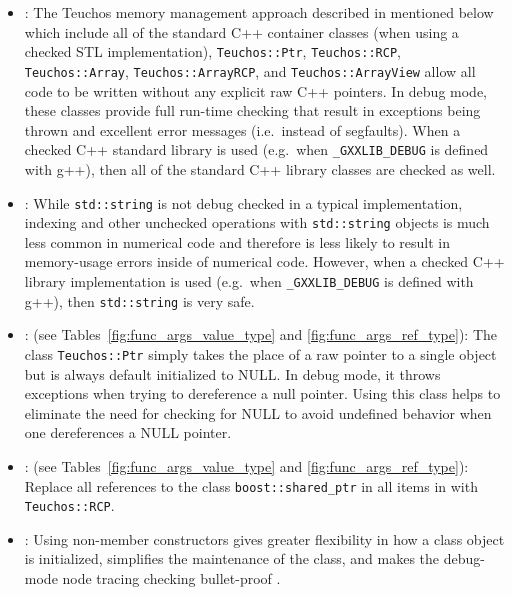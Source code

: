 \begin{itemize}


{}\item\GCGAvoidRawPointers: The Teuchos memory management approach
described in {}\cite{TeuchosMemoryManagementGuide} mentioned below
which include all of the standard C++ container classes (when using a
checked STL implementation), {}\texttt{Teuchos::\-Ptr},
{}\texttt{Teuchos::\-RCP}, {}\texttt{Teuchos::\-Array},
{}\texttt{Teuchos::\-Array\-RCP}, and
{}\texttt{Teuchos::\-Array\-View} allow all code to be written without
any explicit raw C++ pointers.  In debug mode, these classes provide
full run-time checking that result in exceptions being thrown and
excellent error messages (i.e.\ instead of segfaults).  When a checked
C++ standard library is used (e.g.\ when {}\texttt{\_GXXLIB\_DEBUG} is
defined with g++), then all of the standard C++ library classes are
checked as well.


{}\item\GCGUseStdString: While {}\texttt{std\-::string} is not debug checked
in a typical implementation, indexing and other unchecked operations with
{}\texttt{std\-::string} objects is much less common in numerical code and
therefore is less likely to result in memory-usage errors inside of numerical
code.  However, when a checked C++ library implementation is used (e.g.\ when
{}\texttt{\_GXXLIB\_DEBUG} is defined with g++), then {}\texttt{std\-::string}
is very safe.


{}\item\GCGTeuchosPtr: (see Tables~\ref{fig:func_args_value_type} and
{}\ref{fig:func_args_ref_type}): The class {}\texttt{Teuchos\-::Ptr} simply
takes the place of a raw pointer to a single object but is always default
initialized to NULL.  In debug mode, it throws exceptions when trying to
dereference a null pointer.  Using this class helps to eliminate the need for
checking for NULL to avoid undefined behavior when one dereferences a NULL
pointer.


{}\item\GCGTeuchosRCP: (see Tables~\ref{fig:func_args_value_type} and
{}\ref{fig:func_args_ref_type}): Replace all references to the class
{}\texttt{boost::\-shared\_ptr} in all items in {}\cite{C++CodingStandards05}
with {}\texttt{Teuchos::\-RCP}.


{}\item\GCGNonmemberConstructors: Using non-member constructors gives
greater flexibility in how a class object is initialized, simplifies
the maintenance of the class, and makes the debug-mode node tracing
checking bullet-proof {}\cite{TeuchosMemoryManagementGuide}.


\end{itemize}

